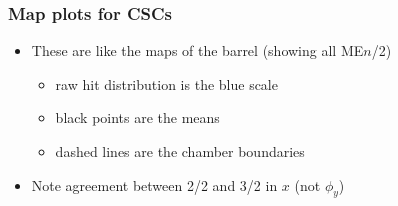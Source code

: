 \documentclass[compress]{beamer}
\begin{document}
\begin{frame}
\frametitle{Map plots for CSCs}

\begin{itemize}
\item These are like the maps of the barrel (showing all ME$n$/2)
\begin{itemize}
\item raw hit distribution is the blue scale
\item black points are the means
\item dashed lines are the chamber boundaries
\end{itemize}
\item Note agreement between 2/2 and 3/2 in $x$ (not $\phi_y$)
\end{itemize}



\end{frame}
\end{document}
